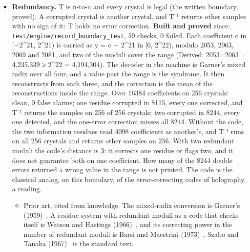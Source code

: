 \begin{itemize}
\item \textbf{Redundancy.} T is n-to-n and every crystal is legal (the written boundary, proved). A corrupted crystal is another crystal, and T⁻¹ returns other samples with no sign of it: T holds no error correction. \textbf{Built and proved} since: \texttt{test/\allowbreak{}engine/\allowbreak{}record\_\allowbreak{}boundary\_\allowbreak{}test}, 59 checks, 0 failed. Each coefficient c in [−2\textasciicircum{}21, 2\textasciicircum{}21) is carried as y = c + 2\textasciicircum{}21 in [0, 2\textasciicircum{}22), modulo 2053, 2063, 2069 and 2081, and two of the moduli cover the range (Derived: 2053·2063 = 4,235,339 ≥ 2\textasciicircum{}22 = 4,194,304). The decoder in the machine is Garner's mixed radix over all four, and a value past the range is the syndrome. It then reconstructs from each three, and the correction is the mean of the reconstructions inside the range. Over 16384 coefficients on 256 crystals: clean, 0 false alarms; one residue corrupted in 8115, every one corrected, and T⁻¹ returns the samples on 256 of 256 crystals; two corrupted in 8244, every one detected, and the one-error correction misses all 8244. Without the code, the two information residues read 4098 coefficients as another's, and T⁻¹ runs on all 256 crystals and returns other samples on 256. With two redundant moduli the code's distance is 3: it corrects one residue or flags two, and it does not guarantee both on one coefficient. How many of the 8244 double errors returned a wrong value in the range is not printed. The code is the classical analog, on this boundary, of the error-correcting codes of holography, a reading.

\begin{itemize}
\item Prior art, cited from knowledge. The mixed-radix conversion is Garner's (1959)~\cite{src:Garner-1959}. A residue system with redundant moduli as a code that checks itself is Watson and Hastings (1966)~\cite{src:Watson-and-Hastings-1966}, and its correcting power in the number of redundant moduli is Barsi and Maestrini (1973)~\cite{src:Barsi-and-Maestrini-1973}. Szabo and Tanaka (1967)~\cite{src:Szabo-and-Tanaka-1967} is the standard text.
\end{itemize}
\end{itemize}
